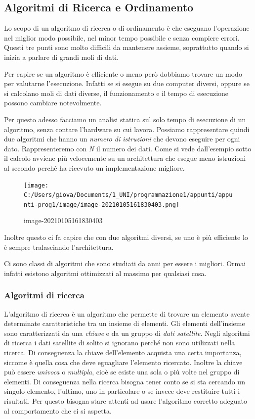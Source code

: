 \documentclass[
  paper=a4,
  oneside  ,captions=tableheading
]{scrbook}
\begin{document}
\hypertarget{algoritmi-di-ricerca-e-ordinamento}{%
\subsection{Algoritmi di Ricerca e
Ordinamento}\label{algoritmi-di-ricerca-e-ordinamento}}

Lo scopo di un algoritmo di ricerca o di ordinamento è che eseguano
l'operazione nel miglior modo possibile, nel minor tempo possibile e
senza compiere errori. Questi tre punti sono molto difficili da
mantenere assieme, soprattutto quando si inizia a parlare di grandi moli
di dati.

Per capire se un algoritmo è efficiente o meno però dobbiamo trovare un
modo per valutarne l'esecuzione. Infatti se si esegue su due computer
diversi, oppure se si calcolano moli di dati diverse, il funzionamento e
il tempo di esecuzione possono cambiare notevolmente.

Per questo adesso facciamo un analisi statica sul solo tempo di
esecuzione di un algoritmo, senza contare l'hardware su cui lavora.
Possiamo rappresentare quindi due algoritmi che hanno un \emph{numero di
istruzioni} che devono eseguire per ogni dato. Rappresenteremo con
\emph{N} il numero dei dati. Come si vede dall'esempio sotto il calcolo
avviene più velocemente su un architettura che esegue meno istruzioni al
secondo perché ha ricevuto un implementazione migliore.

\begin{figure}
\centering
\texttt{[image: C:/Users/giova/Documents/1\_UNI/programmazione1/appunti/appunti-prog1/image/image-20210105161830403.png]}
\caption{image-20210105161830403}
\end{figure}

Inoltre questo ci fa capire che con due algoritmi diversi, se uno è più
efficiente lo è sempre tralasciando l'architettura.

Ci sono classi di algoritmi che sono studiati da anni per essere i
migliori. Ormai infatti esistono algoritmi ottimizzati al massimo per
qualsiasi cosa.

\hypertarget{algoritmi-di-ricerca}{%
\subsubsection{Algoritmi di ricerca}\label{algoritmi-di-ricerca}}

L'algoritmo di ricerca è un algoritmo che permette di trovare un
elemento avente determinate caratteristiche tra un insieme di elementi.
Gli elementi dell'insieme sono caratterizzati da una \emph{chiave} e da
un gruppo di \emph{dati satellite}. Negli algoritmi di ricerca i dati
satellite di solito si ignorano perché non sono utilizzati nella
ricerca. Di conseguenza la chiave dell'elemento acquista una certa
importanza, siccome è quella cosa che deve eguagliare l'elemento
ricercato. Inoltre la chiave può essere \emph{univoca} o
\emph{multipla}, cioè se esiste una sola o più volte nel gruppo di
elementi. Di conseguenza nella ricerca bisogna tener conto se si sta
cercando un singolo elemento, l'ultimo, uno in particolare o se invece
deve restituire tutti i risultati. Per questo bisogna stare attenti ad
usare l'algoritmo corretto adeguato al comportamento che ci si aspetta.
\end{document}
